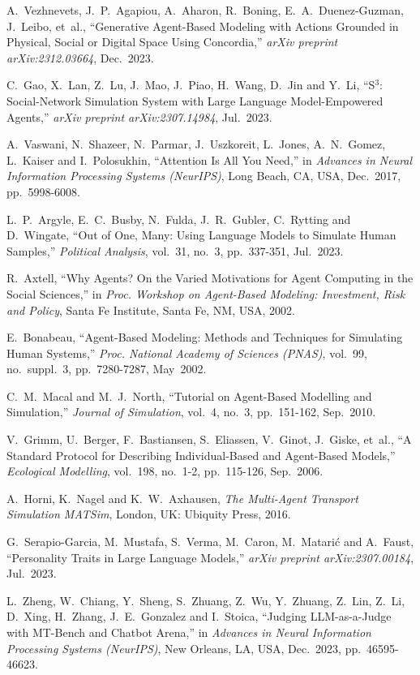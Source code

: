 \documentclass[12pt,a4paper]{report}
\begin{document}
\begin{enumerate}[label={[\arabic*]}, itemsep=2pt, parsep=0pt, topsep=0pt, leftmargin=2em]
A.~Vezhnevets, J.~P.~Agapiou, A.~Aharon, R.~Boning, E.~A.~Duenez-Guzman, J.~Leibo, et~al.,
``Generative Agent-Based Modeling with Actions Grounded in Physical, Social or Digital Space Using Concordia,''
\textit{arXiv preprint arXiv:2312.03664}, Dec.~2023.

C.~Gao, X.~Lan, Z.~Lu, J.~Mao, J.~Piao, H.~Wang, D.~Jin and Y.~Li,
``S$^3$: Social-Network Simulation System with Large Language Model-Empowered Agents,''
\textit{arXiv preprint arXiv:2307.14984}, Jul.~2023.

A.~Vaswani, N.~Shazeer, N.~Parmar, J.~Uszkoreit, L.~Jones, A.~N.~Gomez, L.~Kaiser and I.~Polosukhin,
``Attention Is All You Need,''
in \textit{Advances in Neural Information Processing Systems (NeurIPS)}, Long Beach, CA, USA, Dec.~2017, pp.~5998-6008.

L.~P.~Argyle, E.~C.~Busby, N.~Fulda, J.~R.~Gubler, C.~Rytting and D.~Wingate,
``Out of One, Many: Using Language Models to Simulate Human Samples,''
\textit{Political Analysis}, vol.~31, no.~3, pp.~337-351, Jul.~2023.

R.~Axtell,
``Why Agents? On the Varied Motivations for Agent Computing in the Social Sciences,''
in \textit{Proc. Workshop on Agent-Based Modeling: Investment, Risk and Policy}, Santa Fe Institute, Santa Fe, NM, USA, 2002.

E.~Bonabeau,
``Agent-Based Modeling: Methods and Techniques for Simulating Human Systems,''
\textit{Proc. National Academy of Sciences (PNAS)}, vol.~99, no.~suppl.~3, pp.~7280-7287, May~2002.

C.~M.~Macal and M.~J.~North,
``Tutorial on Agent-Based Modelling and Simulation,''
\textit{Journal of Simulation}, vol.~4, no.~3, pp.~151-162, Sep.~2010.

V.~Grimm, U.~Berger, F.~Bastiansen, S.~Eliassen, V.~Ginot, J.~Giske, et~al.,
``A Standard Protocol for Describing Individual-Based and Agent-Based Models,''
\textit{Ecological Modelling}, vol.~198, no.~1-2, pp.~115-126, Sep.~2006.

A.~Horni, K.~Nagel and K.~W.~Axhausen,
\textit{The Multi-Agent Transport Simulation MATSim},
London, UK: Ubiquity Press, 2016.

G.~Serapio-Garcia, M.~Mustafa, S.~Verma, M.~Caron, M.~Matari{\'c} and A.~Faust,
``Personality Traits in Large Language Models,''
\textit{arXiv preprint arXiv:2307.00184}, Jul.~2023.

L.~Zheng, W.~Chiang, Y.~Sheng, S.~Zhuang, Z.~Wu, Y.~Zhuang, Z.~Lin, Z.~Li, D.~Xing, H.~Zhang, J.~E.~Gonzalez and I.~Stoica,
``Judging LLM-as-a-Judge with MT-Bench and Chatbot Arena,''
in \textit{Advances in Neural Information Processing Systems (NeurIPS)}, New Orleans, LA, USA, Dec.~2023, pp.~46595-46623.

\end{enumerate}
\endgroup
\end{document}
